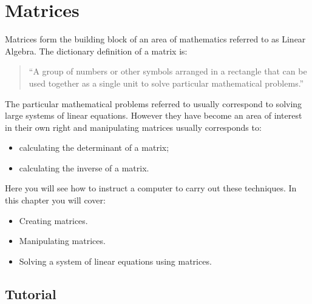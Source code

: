 \chapter{Matrices}
\label{chp:matrices}

Matrices form the building block of an area of mathematics referred to as Linear
Algebra. The dictionary definition of a matrix is:

\begin{quote}
``A group of numbers or other symbols arranged in a rectangle that can be used
together as a single unit to solve particular mathematical problems.''
\end{quote}


The particular mathematical problems referred to usually correspond to solving large
systems of linear equations. However they have become an area of interest in
their own right and manipulating matrices usually corresponds to:
\begin{itemize}
\item 

calculating the determinant of a matrix;

\item 

calculating the inverse of a matrix.

\end{itemize}


Here you will see how to instruct a computer to carry out these techniques.
In this chapter you will cover:

\begin{itemize}
\item 

Creating matrices.

\item 

Manipulating matrices.

\item 

Solving a system of linear equations using matrices.

\end{itemize}





\section{Tutorial}
\label{\detokenize{tools-for-mathematics/04-matrices/tutorial/main:tutorial}}\label{\detokenize{tools-for-mathematics/04-matrices/tutorial/main::doc}}

